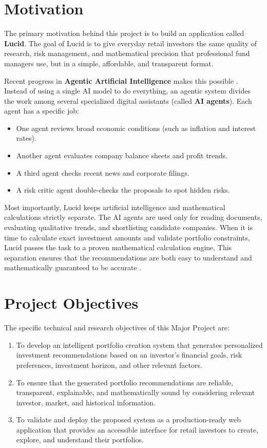 \section{Motivation}
The primary motivation behind this project is to build an application called \textbf{Lucid}. The goal of Lucid is to give everyday retail investors the same quality of research, risk management, and mathematical precision that professional fund managers use, but in a simple, affordable, and transparent format.

Recent progress in \textbf{Agentic Artificial Intelligence} makes this possible \cite{hajaghaie2025}. Instead of using a single AI model to do everything, an agentic system divides the work among several specialized digital assistants (called \textbf{AI agents}). Each agent has a specific job:
\begin{itemize}
    \item One agent reviews broad economic conditions (such as inflation and interest rates).
    \item Another agent evaluates company balance sheets and profit trends.
    \item A third agent checks recent news and corporate filings.
    \item A risk critic agent double-checks the proposals to spot hidden risks.
\end{itemize}

Most importantly, Lucid keeps artificial intelligence and mathematical calculations strictly separate. The AI agents are used only for reading documents, evaluating qualitative trends, and shortlisting candidate companies. When it is time to calculate exact investment amounts and validate portfolio constraints, Lucid passes the task to a proven mathematical calculation engine. This separation ensures that the recommendations are both easy to understand and mathematically guaranteed to be accurate \cite{fatouros2024}.

\section{Project Objectives}
The specific technical and research objectives of this Major Project are:

\begin{enumerate}
    \item To develop an intelligent portfolio creation system that generates personalized investment recommendations based on an investor's financial goals, risk preferences, investment horizon, and other relevant factors.
    \item To ensure that the generated portfolio recommendations are reliable, transparent, explainable, and mathematically sound by considering relevant investor, market, and historical information.
    \item To validate and deploy the proposed system as a production-ready web application that provides an accessible interface for retail investors to create, explore, and understand their portfolios.
\end{enumerate}

